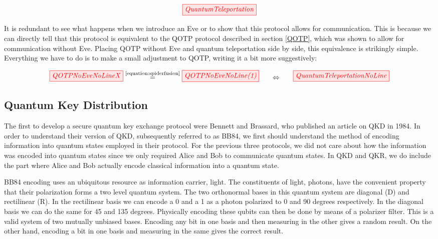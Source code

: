 \documentclass[]{article}
\newcommand{\equaltext}[1]{\ensuremath{\stackrel{\text{#1}}{=}}}
\begin{document}
\begin{equation}
	\label{equation:quantumteleportation}
	\tikzfig{QuantumTeleportation}
\end{equation}
 
It is redundant to see what happens when we introduce an Eve or to show that this protocol allows for communication. This is because we can directly tell that this protocol is equivalent to the QOTP protocol described in section \ref{QOTP}, which was shown to allow for communication without Eve. Placing QOTP without Eve and quantum teleportation side by side, this equivalence is strikingly simple. Everything we have to do is to make a small adjustment to QOTP, writing it a bit more suggestively:

\begin{equation}
\label{equation:QOTPQuantumTeleportationEquivalence}
\tikzfig{QOTPNoEveNoLineX} \equaltext{\ref{equation:spiderfusion}} \tikzfig{QOTPNoEveNoLine(1)}~~~~~ \Leftrightarrow ~~~~~\tikzfig{QuantumTeleportationNoLine}
\end{equation}
 
\subsection{Quantum Key Distribution}

\label{QuantumKeyDistribution}

The first to develop a secure quantum key exchange protocol were Bennett and Brassard, who published an article on QKD in 1984. In order to understand their version of QKD, subsequently referred to as BB84, we first should understand the method of encoding information into quantum states employed in their protocol. For the previous three protocols, we did not care about how the information was encoded into quantum states since we only required Alice and Bob to communicate quantum states. In QKD and QKR, we do include the part where Alice and Bob actually encode classical information into a quantum state.

BB84 encoding uses an ubiquitous resource as information carrier, light. The constituents of light, photons, have the convenient property that their polarization forms a two level quantum system. The two orthonormal bases in this quantum system are diagonal (D) and rectilinear (R). In the rectilinear basis we can encode a 0 and a 1 as a photon polarized to 0 and 90 degrees respectively. In the diagonal basis we can do the same for 45 and 135 degrees. Physically encoding these qubits can then be done by means of a polarizer filter. This is a valid system of two mutually unbiased bases. Encoding any bit in one basis and then measuring in the other gives a random result. On the other hand, encoding a bit in one basis and measuring in the same gives the correct result. 
\end{document}
